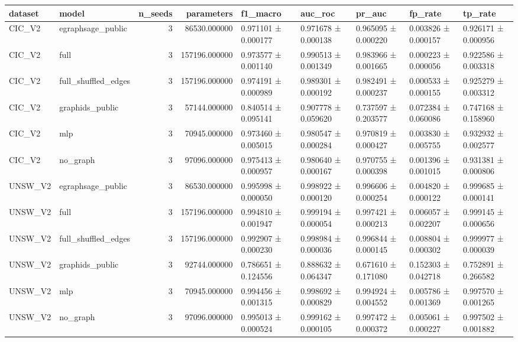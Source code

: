\begin{tabular}{llrrlllll}
\toprule
dataset & model & n\_seeds & parameters & f1\_macro & auc\_roc & pr\_auc & fp\_rate & tp\_rate \\
\midrule
CIC\_V2 & egraphsage\_public & 3 & 86530.000000 & 0.971101 ± 0.000177 & 0.971678 ± 0.000138 & 0.965095 ± 0.000220 & 0.003826 ± 0.000157 & 0.926171 ± 0.000956 \\
CIC\_V2 & full & 3 & 157196.000000 & 0.973577 ± 0.001140 & 0.990513 ± 0.001349 & 0.983966 ± 0.001665 & 0.000223 ± 0.000056 & 0.922586 ± 0.003318 \\
CIC\_V2 & full\_shuffled\_edges & 3 & 157196.000000 & 0.974191 ± 0.000989 & 0.989301 ± 0.000192 & 0.982491 ± 0.000237 & 0.000533 ± 0.000155 & 0.925279 ± 0.003312 \\
CIC\_V2 & graphids\_public & 3 & 57144.000000 & 0.840514 ± 0.095141 & 0.907778 ± 0.059620 & 0.737597 ± 0.203577 & 0.072384 ± 0.060086 & 0.747168 ± 0.158960 \\
CIC\_V2 & mlp & 3 & 70945.000000 & 0.973460 ± 0.005015 & 0.980547 ± 0.000284 & 0.970819 ± 0.000427 & 0.003830 ± 0.005755 & 0.932932 ± 0.002577 \\
CIC\_V2 & no\_graph & 3 & 97096.000000 & 0.975413 ± 0.000957 & 0.980640 ± 0.000167 & 0.970755 ± 0.000398 & 0.001396 ± 0.001015 & 0.931381 ± 0.000806 \\
UNSW\_V2 & egraphsage\_public & 3 & 86530.000000 & 0.995998 ± 0.000050 & 0.998922 ± 0.000120 & 0.996606 ± 0.000254 & 0.004820 ± 0.000122 & 0.999685 ± 0.000141 \\
UNSW\_V2 & full & 3 & 157196.000000 & 0.994810 ± 0.001947 & 0.999194 ± 0.000054 & 0.997421 ± 0.000213 & 0.006057 ± 0.002207 & 0.999145 ± 0.000656 \\
UNSW\_V2 & full\_shuffled\_edges & 3 & 157196.000000 & 0.992907 ± 0.000230 & 0.998984 ± 0.000036 & 0.996844 ± 0.000145 & 0.008804 ± 0.000302 & 0.999977 ± 0.000039 \\
UNSW\_V2 & graphids\_public & 3 & 92744.000000 & 0.786651 ± 0.124556 & 0.888632 ± 0.064347 & 0.671610 ± 0.171080 & 0.152303 ± 0.042718 & 0.752891 ± 0.266582 \\
UNSW\_V2 & mlp & 3 & 70945.000000 & 0.994456 ± 0.001315 & 0.998692 ± 0.000829 & 0.994924 ± 0.004552 & 0.005786 ± 0.001369 & 0.997570 ± 0.001265 \\
UNSW\_V2 & no\_graph & 3 & 97096.000000 & 0.995013 ± 0.000524 & 0.999162 ± 0.000105 & 0.997472 ± 0.000372 & 0.005061 ± 0.000227 & 0.997502 ± 0.001882 \\
\bottomrule
\end{tabular}
